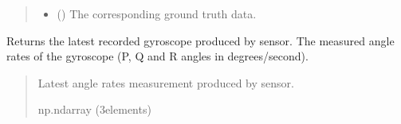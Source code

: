 \documentclass[letterpaper,10pt,english]{sphinxmanual}
\begin{document}
\begin{fulllineitems}
\begin{fulllineitems}
\begin{quote}
\begin{description}
\begin{itemize}
\item {} 
\sphinxAtStartPar
{} ({\hyperref[\detokenize{modules/waypoints/trajectory:qnav.waypoints.trajectory.GroundTruth}]{}}) \textendash{} The corresponding ground truth data.

\end{itemize}

\end{description}\end{quote}

\end{fulllineitems}


\begin{fulllineitems}
\label{\detokenize{modules/measurement/gyroscope:qnav.measurement.gyroscope.Gyroscope.last_measurement}}
\pysigstartsignatures
{}
\pysigstopsignatures
\sphinxAtStartPar
Returns the latest recorded gyroscope produced by sensor.
The measured angle rates of the gyroscope (P, Q and R
angles in degrees/second).
\begin{quote}\begin{description}
\sphinxAtStartPar
Latest angle rates measurement produced by sensor.

\sphinxAtStartPar
np.ndarray (3\sphinxhyphen{}elements)

\end{description}\end{quote}

\end{fulllineitems}



\end{fulllineitems}
\end{document}
